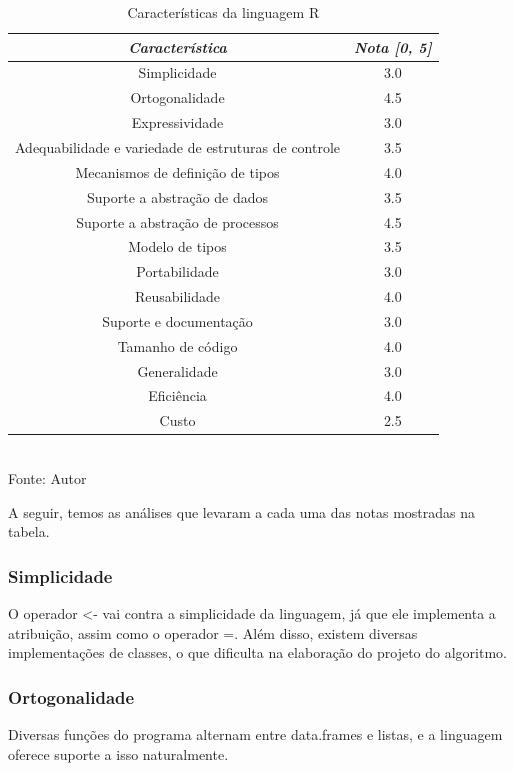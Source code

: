 \documentclass[rel_mlp]{iiufrgs}
\newcommand{\fonte}[1]{\\Fonte: {#1}}
\begin{document}
\begin{table}[ht]
  \caption{Características da linguagem R}
  \centering
    \begin{tabular}{ c | c }
        \hline
        \textit{Característica} &
        \textit{Nota [0, 5]} \\
        \hline
        Simplicidade & 3.0\\
        \hline
        Ortogonalidade & 4.5\\
        \hline
        Expressividade & 3.0\\
        \hline
        Adequabilidade e variedade de estruturas de controle & 3.5\\
        \hline
        Mecanismos de definição de tipos & 4.0\\
        \hline
        Suporte a abstração de dados & 3.5\\
        \hline
        Suporte a abstração de processos & 4.5\\
        \hline
        Modelo de tipos & 3.5\\
        \hline
        Portabilidade & 3.0\\
        \hline
        Reusabilidade & 4.0\\
        \hline
        Suporte e documentação & 3.0\\
        \hline
        Tamanho de código & 4.0\\
        \hline
        Generalidade & 3.0\\
        \hline
        Eficiência & 4.0\\
        \hline
        Custo & 2.5\\
      \hline
    \end{tabular}
     \fonte{Autor}
  \label{tab:caracteristicas}
\end{table}

A seguir, temos as análises que levaram a cada uma das notas mostradas na tabela.

\subsubsection{Simplicidade}
O operador <- vai contra a simplicidade da linguagem, já que ele implementa a atribuição, assim como o operador =.
Além disso, existem diversas implementações de classes, o que dificulta na elaboração do projeto do algoritmo.

\subsubsection{Ortogonalidade}
Diversas funções do programa alternam entre data.frames e listas, e a linguagem oferece suporte a isso naturalmente.
\end{document}
